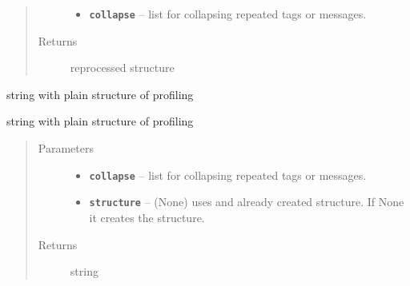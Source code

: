 \documentclass[letterpaper,10pt,english]{sphinxmanual}
\begin{document}
\begin{fulllineitems}
\begin{fulllineitems}
\begin{quote}
\begin{description}
\begin{itemize}
\item {} 
\textbf{\texttt{collapse}} -- list for collapsing repeated tags or messages.

\end{itemize}

\item[{Returns}] \leavevmode
reprocessed structure

\end{description}\end{quote}

\end{fulllineitems}


\begin{fulllineitems}
\label{RRtoolbox.lib:RRtoolbox.lib.root.Profiler.string_lines}
string with plain structure of profiling

\end{fulllineitems}


\begin{fulllineitems}
\label{RRtoolbox.lib:RRtoolbox.lib.root.Profiler.string_structured}
string with plain structure of profiling
\begin{quote}\begin{description}
\item[{Parameters}] \leavevmode\begin{itemize}
\item {} 
\textbf{\texttt{collapse}} -- list for collapsing repeated tags or messages.

\item {} 
\textbf{\texttt{structure}} -- (None) uses and already created structure. If None
it creates the structure.

\end{itemize}

\item[{Returns}] \leavevmode
string

\end{description}\end{quote}

\end{fulllineitems}



\end{fulllineitems}
\end{document}
